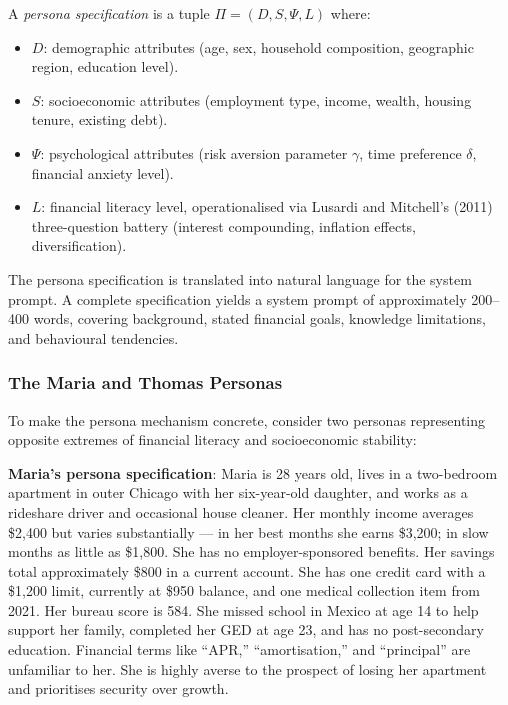 \begin{context}
\begin{definition}
\label{def:persona}
A \emph{persona specification} is a tuple $\Pi = (D, S, \Psi, L)$ where:
\begin{itemize}
  \item $D$: demographic attributes (age, sex, household composition, geographic region, education level).
  \item $S$: socioeconomic attributes (employment type, income, wealth, housing tenure, existing debt).
  \item $\Psi$: psychological attributes (risk aversion parameter $\gamma$, time preference $\delta$, financial anxiety level).
  \item $L$: financial literacy level, operationalised via Lusardi and Mitchell's (2011) three-question battery (interest compounding, inflation effects, diversification).
\end{itemize}
\end{definition}

The persona specification is translated into natural language for the system prompt. A complete specification yields a system prompt of approximately 200--400 words, covering background, stated financial goals, knowledge limitations, and behavioural tendencies.

\subsubsection*{The Maria and Thomas Personas}

To make the persona mechanism concrete, consider two personas representing opposite extremes of financial literacy and socioeconomic stability:

\begin{example}
\label{ex:personas}

\textbf{Maria's persona specification}: Maria is 28 years old, lives in a two-bedroom apartment in outer Chicago with her six-year-old daughter, and works as a rideshare driver and occasional house cleaner. Her monthly income averages \$2,400 but varies substantially --- in her best months she earns \$3,200; in slow months as little as \$1,800. She has no employer-sponsored benefits. Her savings total approximately \$800 in a current account. She has one credit card with a \$1,200 limit, currently at \$950 balance, and one medical collection item from 2021. Her bureau score is 584. She missed school in Mexico at age 14 to help support her family, completed her GED at age 23, and has no post-secondary education. Financial terms like ``APR,'' ``amortisation,'' and ``principal'' are unfamiliar to her. She is highly averse to the prospect of losing her apartment and prioritises security over growth.


\end{example}
\end{context}
